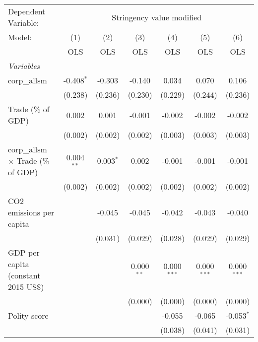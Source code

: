 
\begingroup
\centering
\begin{tabular}{lcccccc}
   \toprule
   Dependent Variable: & \multicolumn{6}{c}{Stringency value modified}\\
   Model:                                    & (1)          & (2)         & (3)          & (4)           & (5)           & (6)\\  
                                             &  OLS         & OLS         & OLS          & OLS           & OLS           & OLS\\  
   \midrule
   \emph{Variables}\\
   corp\_allsm                               & -0.408$^{*}$ & -0.303      & -0.140       & 0.034         & 0.070         & 0.106\\   
                                             & (0.238)      & (0.236)     & (0.230)      & (0.229)       & (0.244)       & (0.236)\\   
   Trade (\% of GDP)                         & 0.002        & 0.001       & -0.001       & -0.002        & -0.002        & -0.002\\   
                                             & (0.002)      & (0.002)     & (0.002)      & (0.003)       & (0.003)       & (0.003)\\   
   corp\_allsm $\times$ Trade (\% of GDP)    & 0.004$^{**}$ & 0.003$^{*}$ & 0.002        & -0.001        & -0.001        & -0.001\\   
                                             & (0.002)      & (0.002)     & (0.002)      & (0.002)       & (0.002)       & (0.002)\\   
   CO2 emissions per capita                  &              & -0.045      & -0.045       & -0.042        & -0.043        & -0.040\\   
                                             &              & (0.031)     & (0.029)      & (0.028)       & (0.029)       & (0.029)\\   
   GDP per capita (constant 2015 US\$)       &              &             & 0.000$^{**}$ & 0.000$^{***}$ & 0.000$^{***}$ & 0.000$^{***}$\\   
                                             &              &             & (0.000)      & (0.000)       & (0.000)       & (0.000)\\   
   Polity score                              &              &             &              & -0.055        & -0.065        & -0.053$^{*}$\\   
                                             &              &             &              & (0.038)       & (0.041)       & (0.031)\\   

\end{tabular}
